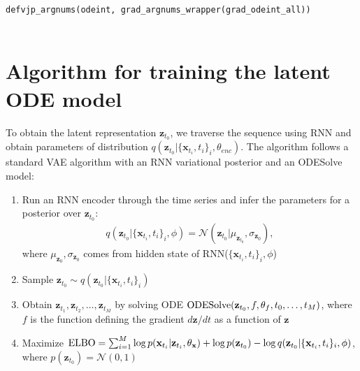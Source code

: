 \documentclass{article}
\newcommand{\vx}{\mathbf{x}}
\newcommand{\vz}{\mathbf{z}}
\newcommand{\obs}{\vx}
\newcommand{\sol}{\vz}  %
\newcommand{\solvefunc}{\textnormal{ODESolve}}
\begin{document}
\begin{appendices}
\begin{lstlisting}
defvjp_argnums(odeint, grad_argnums_wrapper(grad_odeint_all))


\end{lstlisting}


\section{Algorithm for training the latent ODE model}
\label{lode alg}

To obtain the latent representation $\sol_{t_0}$, we traverse the sequence using RNN and obtain parameters of  distribution $q(\sol_{t_0}| \{\vx_{t_i}, t_i\}_i, \theta_{enc})$. The algorithm follows a standard VAE algorithm with an RNN variational posterior and an ODESolve model:
\begin{enumerate}
\item Run an RNN encoder through the time series and infer the parameters for a posterior over $\sol_{t_0}$:
\begin{align} q(\sol_{t_0}| \{\vx_{t_i}, t_i\}_i, \phi) = \mathcal{N}(\sol_{t_0} | \mu_{\sol_{t_0}}, \sigma_{\sol_0}), \end{align}  where
$\mu_{\sol_0}, \sigma_{\sol_0}$ comes from hidden state of  RNN($\{\vx_{t_i}, t_i\}_i, \phi$)
\item Sample $\sol_{t_0} \sim q(\sol_{t_0}| \{\vx_{t_i}, t_i\}_i)$
\item Obtain $\sol_{t_1}, \sol_{t_2}, \dots, \sol_{t_M}$ by solving ODE $\solvefunc(\sol_{t_0}, f, \theta_f, t_0, \dots, t_M)$, where $f$ is the function defining the gradient $d\sol/dt$ as a function of $\sol$
\item Maximize $ \textnormal{ELBO} =   \sum_{i=1}^M \log p(\vx_{t_i} | \sol_{t_i}, \theta_{\obs}) + \log p(\sol_{t_0}) - \log  q(\sol_{t_0}| \{\vx_{t_i}, t_i\}_i, \phi)$, \\
where $p(\sol_{t_0}) = \mathcal{N}(0,1)$
\end{enumerate}


\end{appendices}
\end{document}
